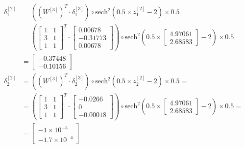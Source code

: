 \documentclass[12pt]{article}
\begin{document}
\begin{enumerate}[leftmargin=\labelsep]
        \begingroup
        \allowdisplaybreaks
        \begin{align*}
          \delta^{[2]}_1 & = \left(\left(W^{[3]}\right)^{T} \cdot \delta^{[3]}_1\right) \circ \text{sech}^{2}\left(0.5\times z^{[2]}_1 - 2\right) \times 0.5 =                                                                                                                    \\
                         & = \left(\begin{bmatrix} 1 & 1 \\ 3 & 1 \\ 1 & 1\end{bmatrix}^{T} \cdot \begin{bmatrix} 0.00678 \\ -0.31773 \\ 0.00678 \end{bmatrix}\right) \circ \text{sech}^{2}\left(0.5\times\begin{bmatrix} 4.97061 \\ 2.68583\end{bmatrix} - 2\right) \times 0.5 = \\
                         & = \begin{bmatrix} -0.37448 \\ -0.10156 \end{bmatrix}                                                                                                                                                                                                   \\
          \delta^{[2]}_2 & = \left(\left(W^{[3]}\right)^{T} \cdot \delta^{[3]}_2\right) \circ  \text{sech}^{2}\left(0.5\times z^{[2]}_2 - 2\right) \times 0.5 =                                                                                                                   \\
                         & = \left(\begin{bmatrix} 1 & 1 \\ 3 & 1 \\ 1 & 1\end{bmatrix}^{T} \cdot \begin{bmatrix} -0.0266 \\ 0 \\ -0.00018 \end{bmatrix}\right) \circ \text{sech}^{2}\left(0.5\times\begin{bmatrix} 4.97061 \\ 2.68583\end{bmatrix} - 2\right) \times 0.5 =       \\
                         & = \begin{bmatrix} -1 \times 10^{-5} \\ -1.7 \times 10^{-4} \end{bmatrix}
        \end{align*}
        \endgroup


\end{enumerate}
\end{document}
